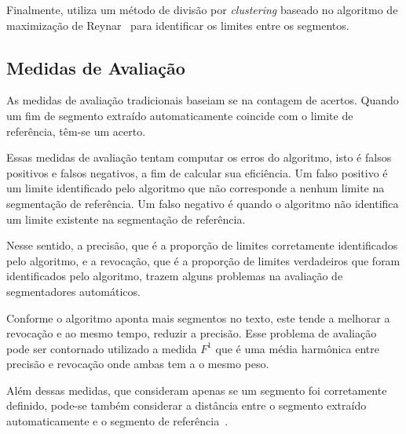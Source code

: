 	
Finalmente, utiliza um método de divisão por \textit{clustering} baseado no algoritmo de maximização de Reynar~\cite{Reynar1998} para identificar os limites entre os segmentos. %




\subsection{Medidas de Avaliação}


As medidas de avaliação tradicionais baseiam se na contagem de acertos. Quando um fim de segmento extraído automaticamente coincide com o limite de referência, têm-se um acerto.

Essas medidas de avaliação tentam computar os erros do algoritmo, isto é falsos positivos e falsos negativos, a fim de calcular sua eficiência. 
%
Um falso positivo é um limite identificado pelo algoritmo que não corresponde a nenhum limite na segmentação de referência. 
%
Um falso negativo é quando o algoritmo não identifica um limite existente na segmentação de referência.


Nesse sentido, 
%
a precisão, que é a proporção de limites corretamente identificados pelo algoritmo, e 
%
a revocação, que é a proporção de limites verdadeiros que foram identificados pelo algoritmo,
%
trazem alguns problemas na avaliação de segmentadores automáticos.
 	
	
Conforme o algoritmo aponta mais segmentos no texto, este tende a melhorar a revocação e ao mesmo tempo, reduzir a precisão. Esse problema de avaliação pode ser contornado utilizado a medida $F^1$ que é uma média harmônica entre precisão e revocação onde ambas tem a o mesmo peso. 

Além dessas medidas, que consideram apenas se um segmento foi corretamente definido, pode-se também considerar a distância entre o segmento extraído automaticamente e o segmento de referência~\cite{Kern2009}.


